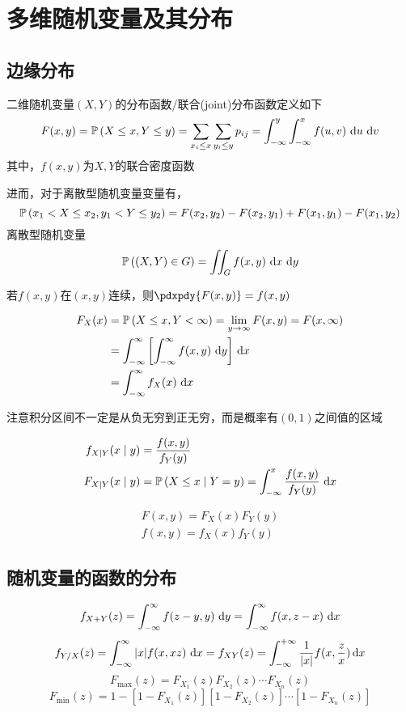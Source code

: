 
\section{多维随机变量及其分布}
\subsection{边缘分布}
\begin{definition}
二维随机变量$(X,Y)$的分布函数/联合(joint)分布函数定义如下
\[F(x,y)=\mathbb{P}\left(X\leq x,Y\leq y\right)=\displaystyle\sum_{x_i\leq x}\sum_{y_i\leq y}p_{ij}=\displaystyle\int_{-\infty}^{y}\int_{-\infty}^{x}f(u,v)\,\,\mathrm{d} u\,\,\mathrm{d} v\]
其中，$f(x,y)$为$X,Y$的联合密度函数
\end{definition}
进而，对于离散型随机变量变量有，
\[\mathbb{P}\left(x_1<X\leq x_2,y_1<Y\leq y_2\right)=F(x_2,y_2)-F(x_2,y_1)+F(x_1,y_1)-F(x_1,y_2)\]
离散型随机变量
\[\mathbb{P}\left((X,Y)\in G\right)=\iint_G f(x,y)\,\,\mathrm{d} x\,\,\mathrm{d} y\]
\par 若$f(x,y)$在$(x,y)$连续，则$\pdxpdy{F(x,y)}=f(x,y)$

\begin{definition}[边缘(marginal)分布]
\[\begin{aligned}
F_X(x)&=\mathbb{P}\left(X\leq x,Y<\infty\right)=\lim_{y\to\infty}F(x,y)=F(x,\infty)\\
&=\displaystyle\int_{-\infty}^{\infty}{\left[\displaystyle\int_{-\infty}^{\infty}{f(x,y)}\,\,\mathrm{d} y\right]}\,\,\mathrm{d} x\\
&=\displaystyle\int_{-\infty}^{\infty}{f_X(x)}\,\,\mathrm{d} x
\end{aligned}\]
\end{definition}
注意积分区间不一定是从负无穷到正无穷，而是概率有$(0,1)$之间值的区域

\begin{definition}[条件概率密度与分布函数]
\[\begin{aligned}
f_{X\mid Y}(x\mid y)&=\dfrac{f(x,y)}{f_Y(y)}\\
F_{X\mid Y}(x\mid y)&=\mathbb{P}\left(X\leq x\mid Y=y\right)=\displaystyle\int_{-\infty}^{x}{\dfrac{f(x,y)}{f_Y(y)}}\,\,\mathrm{d} x
\end{aligned}\]
\end{definition}
\begin{definition}[相互独立]
\[\begin{aligned}
F(x,y)=F_X(x)F_Y(y)\\
f(x,y)=f_X(x)f_Y(y)
\end{aligned}\]
\end{definition}

\subsection{随机变量的函数的分布}
\[f_{X+Y}(z)=\displaystyle\int_{-\infty}^{\infty}{f(z-y,y)}\,\,\mathrm{d} y=\displaystyle\int_{-\infty}^{\infty}{f(x,z-x)}\,\,\mathrm{d} x\]
\[f_{Y/X}(z)=\displaystyle\int_{-\infty}^{\infty}{|x|f(x,xz)}\,\,\mathrm{d} x=f_{XY}(z)=\displaystyle\int_{-\infty}^{+\infty}\dfrac{1}{|x|}f(x,\dfrac{z}{x})\,\mathrm{d} x\]
\[F_{\max}(z)=F_{X_1}(z)F_{X_2}(z)\cdots F_{X_n}(z)\]
\[F_{\min}(z)=1-[1-F_{X_1}(z)][1-F_{X_2}(z)]\cdots [1-F_{X_n}(z)]\]